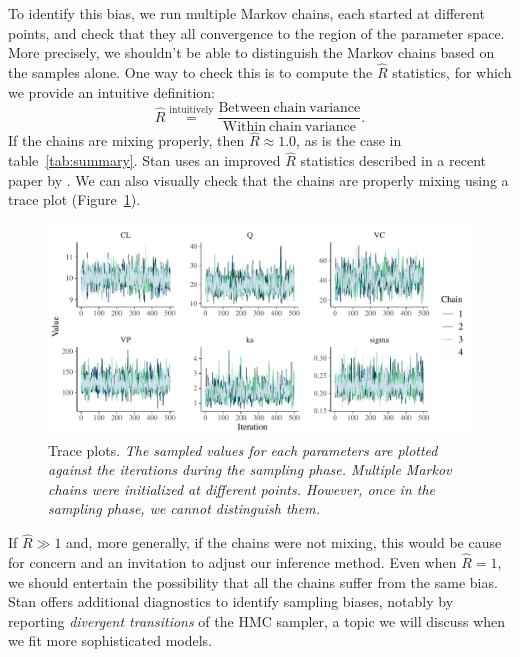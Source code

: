 To identify this bias, we run multiple Markov chains, each started at different points, and check that they all convergence to the region of the parameter space.
More precisely, we shouldn't be able to distinguish the Markov chains based on the samples alone.
One way to check this is to compute the $\hat R$ statistics, for which we provide an intuitive definition:
\begin{equation*}
  \hat R \overset{\mathrm{intuitively}}{=} \frac{\mathrm{Between \ chain \ variance}}{\mathrm{Within \ chain \ variance}}.
\end{equation*}
%
If the chains are mixing properly, then $\hat R \approx 1.0$, as is the case in table~\ref{tab:summary}.
Stan uses an improved $\hat R$ statistics described in a recent paper by \citet{Vehtari:2020}.
We can also visually check that the chains are properly mixing using a trace plot (Figure~\ref{fig:trace}).

\begin{figure}
  \begin{center}
  \includegraphics[width = 6in]{../figures/twocpt_traceplots_4x8.pdf}
  \caption{Trace plots. \textit{The sampled values for each parameters are plotted against the iterations during the sampling phase. Multiple Markov chains were initialized at different points. However, once in the sampling phase, we cannot distinguish them.}}
  \label{fig:trace}
  \end{center}
\end{figure}

If $\hat R \gg 1$ and, more generally, if the chains were not mixing, this would be cause for concern and an invitation to adjust our inference method.
Even when $\hat R = 1$, we should entertain the possibility that all the chains suffer from the same bias.
Stan offers additional diagnostics to identify sampling biases, notably by reporting \textit{divergent transitions} of the HMC sampler, a topic we will discuss when we fit more sophisticated models.

